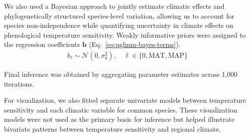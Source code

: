 We also used a Bayesian approach to jointly estimate climatic effects and phylogenetically structured species-level variation, allowing us to account for species non-independence while quantifying uncertainty in climate effects on phenological temperature sensitivity. Weakly informative priors were assigned to the regression coefficients $\boldsymbol{b}$ (Eq.~\ref{eq:pglmm-bayes-terms}). 
\begin{eqnarray}
    b_{\ell} \sim \mathcal{N}(0, \sigma_b^2), \quad {\ell} \in \{0, \mathrm{MAT}, \mathrm{MAP}\}
    \label{eq:pglmm-bayes-terms}
\end{eqnarray}

Final inference was obtained by aggregating parameter estimates across 1,000 iterations. 

For visualization, we also fitted separate univariate models between temperature sensitivity and each climatic variable for common species. These visualization models were not used as the primary basis for inference but helped illustrate bivariate patterns between temperature sensitivity and regional climate.